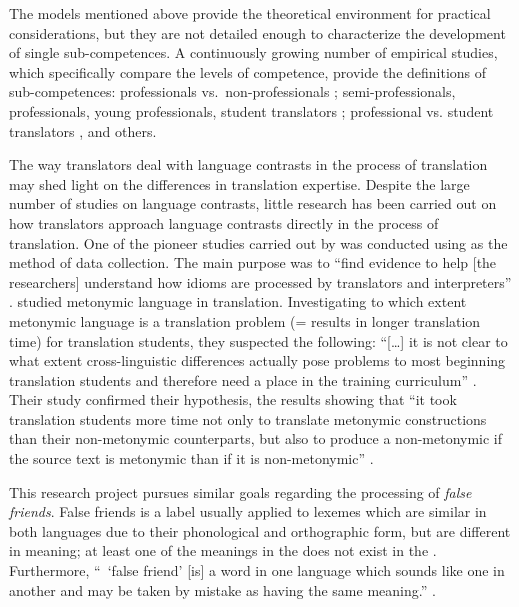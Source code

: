 \documentclass[output=paper]{langsci/langscibook.cls}
\begin{document}
The  models mentioned above provide the theoretical environment for practical considerations, but they are not detailed enough to characterize the development of single sub-competences. A continuously growing number of empirical studies, which specifically compare the levels of competence, provide the definitions of sub-competences: professionals vs.\ non-profes\-sion\-als \citep{Breedveld2002, Jaaskelainen1999}; semi-professionals, professionals, young professionals, student translators \citep{Jarvella2002}; professional vs. student translators \citep{Carl2010Correlating}, and others. 

The way translators deal with language contrasts in the process of translation may shed light on the differences in translation expertise.  Despite the large number of studies on language contrasts, little research has been carried out on how translators approach language contrasts directly in the process of translation. One of the pioneer studies carried out by \citet{Jakobsen2007} was conducted using  as the method of data collection. The main purpose was to ``find evidence to help [the researchers] understand how idioms are processed by translators and interpreters'' \citep[217--218]{Jakobsen2007}.  \citet{Vandepitte2011} studied metonymic language in translation. Investigating to which extent metonymic language is a translation problem (= results in longer translation time) for translation students, they suspected the following: ``[\ldots] it is not clear to what extent cross-linguistic differences actually pose problems to most beginning translation students and therefore need a place in the training curriculum'' \citep[68]{Vandepitte2011}.  Their study confirmed their hypothesis, the results showing that ``it took translation students more time not only to translate metonymic constructions than their non-metonymic counterparts, but also to produce a non-metonymic  if the source text is metonymic than if it is non-metonymic'' \citep[127]{Vandepitte2015}.

This research project pursues similar goals regarding the processing of \textit{false friends}. False friends is a label usually applied to lexemes which are similar in both languages due to their phonological and orthographic form, but are different in meaning; at least one of the meanings in the  does not exist in the  \citep[295]{Pavlova2012}. Furthermore, ``~`false friend' [is] a word in one language which sounds like one in another and may be taken by mistake as having the same meaning.'' \citep[126]{Matthews2007}. 
\end{document}
